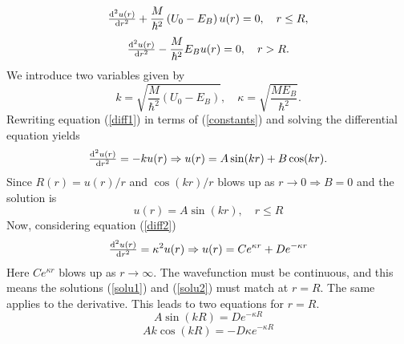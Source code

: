 \begin{equation} \label{diff1}
	\od[2]{u(r)}{r}+\frac{M}{\hbar^2} \left(U_0-E_B \right)u(r)=0, \quad r \leq R,
\end{equation}
\begin{equation} \label{diff2}
	\od[2]{u(r)}{r}-\frac{M}{\hbar^2} E_B u(r)=0, \quad r > R.
\end{equation}
We introduce two variables given by
\begin{equation} \label{constants}
	k=\sqrt{\frac{M}{\hbar^2}\left(U_0-E_B\right)}, \quad \kappa=\sqrt{\frac{M E_B}{\hbar^2}}.
\end{equation}
Rewriting equation (\ref{diff1}) in terms of (\ref{constants}) and solving the differential equation yields
\begin{equation} \label{solu1}
	\od[2]{u(r)}{r} = -ku(r) \Rightarrow u(r) = A\sin(kr)+B\cos(kr).
\end{equation}
Since $R(r) = u(r)/r$ and $\cos(kr)/r$ blows up as $r \rightarrow 0 \Rightarrow B=0$ and the solution is
\begin{equation}
	u(r)=A\sin(kr), \quad r \leq R
\end{equation}
Now, considering equation (\ref{diff2})
\begin{equation} \label{solu2}
	\od[2]{u(r)}{r}  = \kappa^2 u(r) \Rightarrow u(r) = Ce^{\kappa r}+De^{-\kappa r}
\end{equation}
Here $Ce^{\kappa r}$ blows up as $r\rightarrow \infty$. The wavefunction must be continuous, and this means the solutions (\ref{solu1}) and (\ref{solu2}) must match at $r=R$. The same applies to the derivative. This leads to two equations for $r=R$.
\begin{equation} \label{sin}
	A\sin(kR) =De^{-\kappa R}
\end{equation}
\begin{equation} \label{expo}
	Ak\cos(kR) =-D\kappa e^{-\kappa R}
\end{equation}
